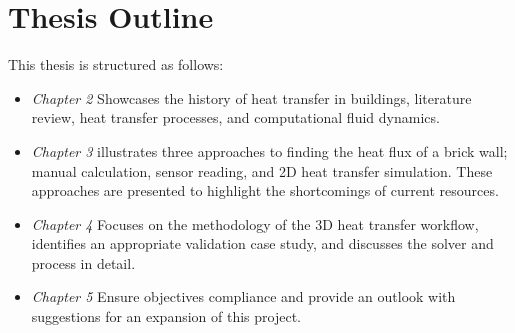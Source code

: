 \section{Thesis Outline}
This thesis is structured as follows:
\begin{itemize}
    \item \textit{Chapter 2} Showcases the history of heat transfer in buildings, literature review, heat transfer processes, and computational fluid dynamics.
    \item \textit{Chapter 3} illustrates three approaches to finding the heat flux of a brick wall; manual calculation, sensor reading, and 2D heat transfer simulation. These approaches are presented to highlight the shortcomings of current resources. 
    \item \textit{Chapter 4} Focuses on the methodology of the 3D heat transfer workflow, identifies an appropriate validation case study, and discusses the solver and process in detail.
    \item \textit{Chapter 5} Ensure objectives compliance and provide an outlook with suggestions for an expansion of this project.
\end{itemize}